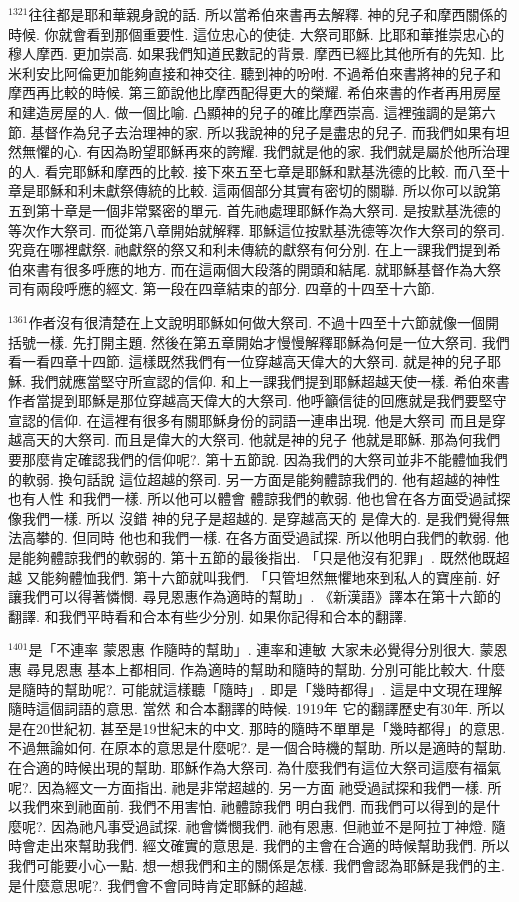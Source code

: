 \documentclass{book}
\begin{document}
$^{1321}$往往都是耶和華親身說的話.
所以當希伯來書再去解釋.
神的兒子和摩西關係的時候.
你就會看到那個重要性.
這位忠心的使徒.
大祭司耶穌.
比耶和華推崇忠心的穆人摩西.
更加崇高.
如果我們知道民數記的背景.
摩西已經比其他所有的先知.
比米利安比阿倫更加能夠直接和神交往.
聽到神的吩咐.
不過希伯來書將神的兒子和摩西再比較的時候.
第三節說他比摩西配得更大的榮耀.
希伯來書的作者再用房屋和建造房屋的人.
做一個比喻.
凸顯神的兒子的確比摩西崇高.
這裡強調的是第六節.
基督作為兒子去治理神的家.
所以我說神的兒子是盡忠的兒子.
而我們如果有坦然無懼的心.
有因為盼望耶穌再來的誇耀.
我們就是他的家.
我們就是屬於他所治理的人.
看完耶穌和摩西的比較.
接下來五至七章是耶穌和默基洗德的比較.
而八至十章是耶穌和利未獻祭傳統的比較.
這兩個部分其實有密切的關聯.
所以你可以說第五到第十章是一個非常緊密的單元.
首先祂處理耶穌作為大祭司.
是按默基洗德的等次作大祭司.
而從第八章開始就解釋.
耶穌這位按默基洗德等次作大祭司的祭司.
究竟在哪裡獻祭.
祂獻祭的祭又和利未傳統的獻祭有何分別.
在上一課我們提到希伯來書有很多呼應的地方.
而在這兩個大段落的開頭和結尾.
就耶穌基督作為大祭司有兩段呼應的經文.
第一段在四章結束的部分.
四章的十四至十六節.

$^{1361}$作者沒有很清楚在上文說明耶穌如何做大祭司.
不過十四至十六節就像一個開括號一樣.
先打開主題.
然後在第五章開始才慢慢解釋耶穌為何是一位大祭司.
我們看一看四章十四節.
這樣既然我們有一位穿越高天偉大的大祭司.
就是神的兒子耶穌.
我們就應當堅守所宣認的信仰.
和上一課我們提到耶穌超越天使一樣.
希伯來書作者當提到耶穌是那位穿越高天偉大的大祭司.
他呼籲信徒的回應就是我們要堅守宣認的信仰.
在這裡有很多有關耶穌身份的詞語一連串出現.
他是大祭司 而且是穿越高天的大祭司.
而且是偉大的大祭司.
他就是神的兒子 他就是耶穌.
那為何我們要那麼肯定確認我們的信仰呢?.
第十五節說.
因為我們的大祭司並非不能體恤我們的軟弱.
換句話說 這位超越的祭司.
另一方面是能夠體諒我們的.
他有超越的神性 也有人性 和我們一樣.
所以他可以體會 體諒我們的軟弱.
他也曾在各方面受過試探 像我們一樣.
所以 沒錯 神的兒子是超越的.
是穿越高天的 是偉大的.
是我們覺得無法高攀的.
但同時 他也和我們一樣.
在各方面受過試探.
所以他明白我們的軟弱.
他是能夠體諒我們的軟弱的.
第十五節的最後指出.
「只是他沒有犯罪」.
既然他既超越 又能夠體恤我們.
第十六節就叫我們.
「只管坦然無懼地來到私人的寶座前.
好讓我們可以得著憐憫.
尋見恩惠作為適時的幫助」.
《新漢語》譯本在第十六節的翻譯.
和我們平時看和合本有些少分別.
如果你記得和合本的翻譯.

$^{1401}$是「不連率 蒙恩惠 作隨時的幫助」.
連率和連敏 大家未必覺得分別很大.
蒙恩惠 尋見恩惠 基本上都相同.
作為適時的幫助和隨時的幫助.
分別可能比較大.
什麼是隨時的幫助呢?.
可能就這樣聽「隨時」.
即是「幾時都得」.
這是中文現在理解隨時這個詞語的意思.
當然 和合本翻譯的時候.
1919年 它的翻譯歷史有30年.
所以是在20世紀初.
甚至是19世紀末的中文.
那時的隨時不單單是「幾時都得」的意思.
不過無論如何.
在原本的意思是什麼呢?.
是一個合時機的幫助.
所以是適時的幫助.
在合適的時候出現的幫助.
耶穌作為大祭司.
為什麼我們有這位大祭司這麼有福氣呢?.
因為經文一方面指出.
祂是非常超越的.
另一方面 祂受過試探和我們一樣.
所以我們來到祂面前.
我們不用害怕.
祂體諒我們 明白我們.
而我們可以得到的是什麼呢?.
因為祂凡事受過試探.
祂會憐憫我們.
祂有恩惠.
但祂並不是阿拉丁神燈.
隨時會走出來幫助我們.
經文確實的意思是.
我們的主會在合適的時候幫助我們.
所以我們可能要小心一點.
想一想我們和主的關係是怎樣.
我們會認為耶穌是我們的主.
是什麼意思呢?.
我們會不會同時肯定耶穌的超越.
\end{document}
